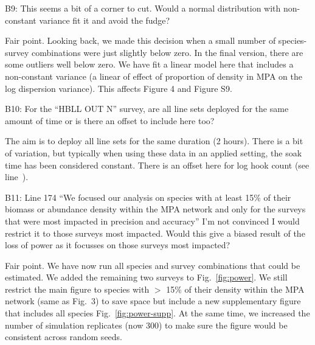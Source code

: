 \documentclass[12pt]{article}
\newcommand{\rev}[1]{{\color{niceblue} #1}}
\newcommand{\lr}[1]{line~\lineref{#1}}
\begin{document}
\rev{B9: This seems a bit of a corner to cut. Would a normal distribution with non-constant variance fit it and avoid the fudge?}

Fair point. Looking back, we made this decision when a small number of species-survey combinations were just slightly below zero. In the final version, there are some outliers well below zero. We have fit a linear model here that includes a non-constant variance (a linear of effect of proportion of density in MPA on the log dispersion variance). This affects Figure 4 and Figure S9.

\rev{B10: For the “HBLL OUT N” survey, are all line sets deployed for the same amount of
time or is there an offset to include here too?}

The aim is to deploy all line sets for the same duration (2 hours). There is a bit of variation, but typically when using these data in an applied setting, the soak time has been considered constant. There is an offset here for log hook count (see \lr{B10}).

\rev{B11: Line 174 “We focused our analysis on species with at least 15\% of their biomass or abundance density within the MPA network and only for the surveys that were most impacted in precision and accuracy” I'm not convinced I would restrict it to those surveys most impacted. Would this give a biased result of the loss of power as it focusses on those surveys most impacted?}

Fair point. We have now run all species and survey combinations that could be estimated. We added the remaining two surveys to Fig.~\ref{fig:power}. We still restrict the main figure to species with $>$ 15\% of their density within the MPA network (same as Fig.~3) to save space but include a new supplementary figure that includes all species Fig.~\ref{fig:power-supp}. At the same time, we increased the number of simulation replicates (now 300) to make sure the figure would be consistent across random seeds.

\end{document}
